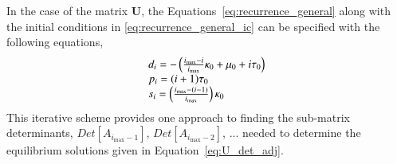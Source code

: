\documentclass[review]{elsarticle}
\newcommand{\imax}{\ensuremath{i_{\max}}\xspace}
\let\bs\boldsymbol
\begin{document}
In the case of the matrix $\bs{U}$, the Equations~\ref{eq:recurrence_general} along with the initial conditions in \ref{eq:recurrence_general_ic} can be specified with the following equations,
\[
\begin{array}{l}
d_{i}=-\left(\frac{\imax-i}{\imax}\kappa_0+\mu_0+i\text{\ensuremath{\tau_0}}\right)\\
p_{i}=(i+1)\tau_0\\
s_{i}=\left(\frac{\imax-(i-1)}{\imax}\right)\kappa_0
\end{array}
\]
This iterative scheme provides one approach to finding the sub-matrix determinants, $Det[A_{\imax-1}]$, $Det[A_{\imax-2}]$, $... $ needed to determine the equilibrium solutions given in Equation~\ref{eq:U_det_adj}. 



 

\end{document}
